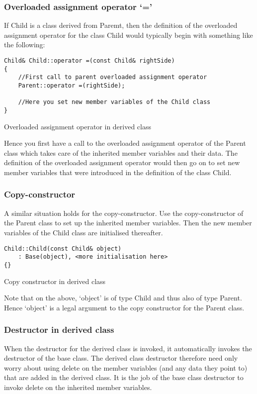 \subsubsection*{Overloaded assignment operator `='}
If Child is a class derived from Paremt, then the definition of the overloaded assignment
operator for the class Child would typically begin with something like the following:

\begin{listing}[H]
\begin{verbatim}
Child& Child::operator =(const Child& rightSide)
{
	//First call to parent overloaded assignment operator
	Parent::operator =(rightSide);

	//Here you set new member variables of the Child class
}
\end{verbatim}
\caption{Overloaded assignment operator in derived class}
\label{source_code_1}
\end{listing}

Hence you first have a call to the overloaded assignment operator of the Parent class
which takes care of the inherited member variables and their data. The definition of the
overloaded assignment operator would then go on to set new member variables that
were introduced in the definition of the class Child.


\subsubsection*{Copy-constructor}
A similar situation holds for the copy-constructor. Use the copy-constructor of the Parent
class to set up the inherited member variables. Then the new member variables of the
Child class are initialised thereafter.

\begin{listing}[H]
\begin{verbatim}
Child::Child(const Child& object)
	: Base(object), <more initialisation here>
{}
\end{verbatim}
\caption{Copy constructor in derived class}
\label{source_code_1}
\end{listing}

Note that on the above, `object' is of type Child and thus also of type Parent. Hence
`object' is a legal argument to the copy constructor for the Parent class.

\subsubsection*{Destructor in derived class}
When the destructor for the derived class is invoked, it automatically invokes the
destructor of the base class. The derived class destructor therefore need only worry
about using delete on the member variables (and any data they point to) that are added
in the derived class. It is the job of the base class destructor to invoke delete on the
inherited member variables.

